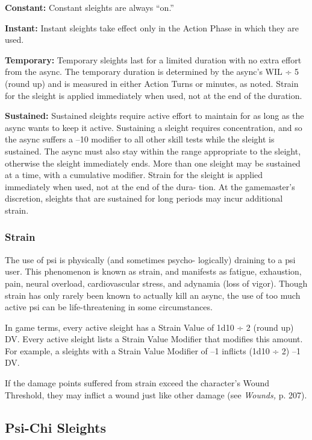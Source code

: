 \textbf{Constant:} Constant sleights are always ``on.''

\textbf{Instant:} Instant sleights take effect only in the 
Action Phase in which they are used.

\textbf{Temporary:} Temporary sleights last for a limited 
duration with no extra effort from the async. The 
temporary duration is determined by the async's WIL 
÷ 5 (round up) and is measured in either Action Turns 
or minutes, as noted. Strain for the sleight is applied 
immediately when used, not at the end of the duration.

\textbf{Sustained:} Sustained sleights require active effort 
to maintain for as long as the async wants to keep 
it active. Sustaining a sleight requires concentration, 
and so the async suffers a –10 modifier to all other 
skill tests while the sleight is sustained. The async 
must also stay within the range appropriate to the 
sleight, otherwise the sleight immediately ends. More 
than one sleight may be sustained at a time, with a 
cumulative modifier. Strain for the sleight is applied 
immediately when used, not at the end of the dura-
tion. At the gamemaster's discretion, sleights that are 
sustained for long periods may incur additional strain.

\subsubsection{Strain}

The use of psi is physically (and sometimes psycho-
logically) draining to a psi user. This phenomenon is 
known as strain, and manifests as fatigue, exhaustion, 
pain, neural overload, cardiovascular stress, and 
adynamia (loss of vigor). Though strain has only 
rarely been known to actually kill an async, the use 
of too much active psi can be life-threatening in some 
circumstances.

In game terms, every active sleight has a Strain 
Value of 1d10 ÷ 2 (round up) DV. Every active sleight 
lists a Strain Value Modifier that modifies this amount. 
For example, a sleights with a Strain Value Modifier 
of –1 inflicts (1d10 ÷ 2) –1 DV.

If the damage points suffered from strain exceed 
the character's Wound Threshold, they may inflict a 
wound just like other damage (see \textit{Wounds,} p. 207).

\subsection{Psi-Chi Sleights}


